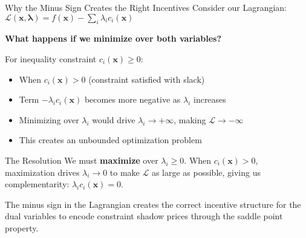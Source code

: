 \documentclass[aspectratio=1610]{beamer}
\begin{document}
\begin{frame}{Why the Minus Sign Creates the Right Incentives}
  Consider our Lagrangian: $\mathcal{L}(\mathbf{x}, \boldsymbol{\lambda}) = f(\mathbf{x}) - \sum_{i} \lambda_i c_i(\mathbf{x})$
  
  \vspace{0.3cm}
  \textbf{What happens if we minimize over both variables?}
  
  For inequality constraint $c_i(\mathbf{x}) \geq 0$:
  \begin{itemize}
    \item When $c_i(\mathbf{x}) > 0$ (constraint satisfied with slack)
    \item Term $-\lambda_i c_i(\mathbf{x})$ becomes more negative as $\lambda_i$ increases
    \item Minimizing over $\lambda_i$ would drive $\lambda_i \to +\infty$, making $\mathcal{L} \to -\infty$ 
    \item This creates an unbounded optimization problem
  \end{itemize}
  
  \vspace{0.3cm}
  \begin{alertblock}{The Resolution}
    We must \textbf{maximize} over $\lambda_i \geq 0$. When $c_i(\mathbf{x}) > 0$, maximization drives $\lambda_i \to 0$ to make $\mathcal{L}$ as large as possible, giving us complementarity: $\lambda_i c_i(\mathbf{x}) = 0$.
  \end{alertblock}
  
  \vspace{0.3cm}
  The minus sign in the Lagrangian creates the correct incentive structure for the dual variables to encode constraint shadow prices through the saddle point property.
\end{frame}
\end{document}
